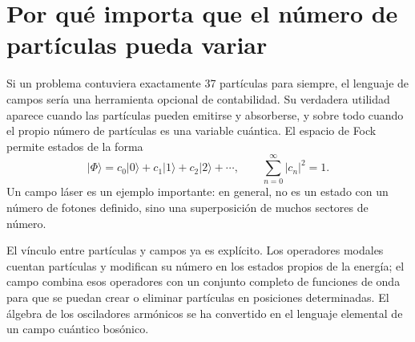 \section{Por qué importa que el número de partículas pueda variar}

Si un problema contuviera exactamente 37 partículas para siempre, el lenguaje de campos sería una herramienta opcional de contabilidad. Su verdadera utilidad aparece cuando las partículas pueden emitirse y absorberse, y sobre todo cuando el propio número de partículas es una variable cuántica. El espacio de Fock permite estados de la forma
\begin{equation}
|\Phi\rangle
=c_0|0\rangle+c_1|1\rangle+c_2|2\rangle+\cdots,
\qquad
\sum_{n=0}^{\infty}|c_n|^2=1.
\end{equation}
Un campo láser es un ejemplo importante: en general, no es un estado con un número de fotones definido, sino una superposición de muchos sectores de número.

El vínculo entre partículas y campos ya es explícito. Los operadores modales cuentan partículas y modifican su número en los estados propios de la energía; el campo combina esos operadores con un conjunto completo de funciones de onda para que se puedan crear o eliminar partículas en posiciones determinadas. El álgebra de los osciladores armónicos se ha convertido en el lenguaje elemental de un campo cuántico bosónico.
